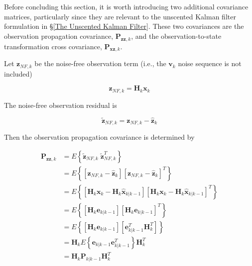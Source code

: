 \documentclass[12pt]{article}
\begin{document}
Before concluding this section, it is worth introducing two additional covariance matrices,
particularly since they are relevant to the unscented Kalman filter formulation in
\S\ref{The Unscented Kalman Filter}.
These two covariances are the observation propagation covariance, $\mathbf{P}_{\mathbf{zz},k}$,
and the observation-to-state transformation cross covariance, $\mathbf{P}_{\mathbf{xz},k}$.

Let $\mathbf{z}_{NF,k}$ be the noise-free observation term (i.e., the $\mathbf{v}_k$ noise
sequence is not included)

\begin{equation*}
    \mathbf{z}_{NF,k} = \mathbf{H}_k \mathbf{x}_k
\end{equation*}

The noise-free observation residual is

\begin{equation*}
    \tilde{\mathbf{z}}_{NF,k} = \mathbf{z}_{NF,k} - \hat{\mathbf{z}}_k
\end{equation*}

Then the observation propagation covariance is determined by

\begin{equation*}
    \begin{aligned}
        \mathbf{P}_{\mathbf{zz},k} &= E \left\{ \tilde{\mathbf{z}}_{NF,k} \; \tilde{\mathbf{z}}_{NF,k}^T \right\} \\
        &= E \left\{ \left[ \mathbf{z}_{NF,k} - \hat{\mathbf{z}}_k \right] \left[ \mathbf{z}_{NF,k} - \hat{\mathbf{z}}_k \right]^T \right\} \\
        &= E \left\{ \left[ \mathbf{H}_k \mathbf{x}_k - \mathbf{H}_k \hat{\mathbf{x}}_{k|k-1} \right] \left[ \mathbf{H}_k \mathbf{x}_k - \mathbf{H}_k \hat{\mathbf{x}}_{k|k-1} \right]^T \right\} \\
        &= E \left\{ \left[ \mathbf{H}_k \mathbf{e}_{k|k-1} \right] \left[ \mathbf{H}_k \mathbf{e}_{k|k-1} \right]^T \right\} \\
        &= E \left\{ \left[ \mathbf{H}_k \mathbf{e}_{k|k-1} \right] \left[ \mathbf{e}_{k|k-1}^T \mathbf{H}_k^T \right] \right\} \\
        &= \mathbf{H}_k E \left\{ \mathbf{e}_{k|k-1} \mathbf{e}_{k|k-1}^T \right\} \mathbf{H}_k^T \\
        &= \mathbf{H}_k \mathbf{P}_{k|k-1} \mathbf{H}_k^T
    \end{aligned}
\end{equation*}
\end{document}
